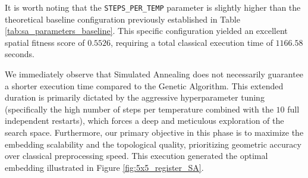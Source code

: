 \begin{table}[H]
    \centering
    \renewcommand{\arraystretch}{1.3}
    \caption{Specific hyperparameter configuration for the Simulated Annealing engine adopted for the $5\times5$ instance evaluation, as extracted from the experimental registry.}
    \label{tab:sa_parameters_5x5}
\end{table}

It is worth noting that the \texttt{STEPS\_PER\_TEMP} parameter is slightly higher than the theoretical baseline configuration previously established in Table \ref{tab:sa_parameters_baseline}. This specific configuration yielded an excellent spatial fitness score of $0.5526$, requiring a total classical execution time of $1166.58$ seconds. 

We immediately observe that Simulated Annealing does not necessarily guarantee a shorter execution time compared to the Genetic Algorithm. This extended duration is primarily dictated by the aggressive hyperparameter tuning (specifically the high number of steps per temperature combined with the $10$ full independent restarts), which forces a deep and meticulous exploration of the search space. Furthermore, our primary objective in this phase is to maximize the embedding scalability and the topological quality, prioritizing geometric accuracy over classical preprocessing speed. This execution generated the optimal embedding illustrated in Figure \ref{fig:5x5_register_SA}.

